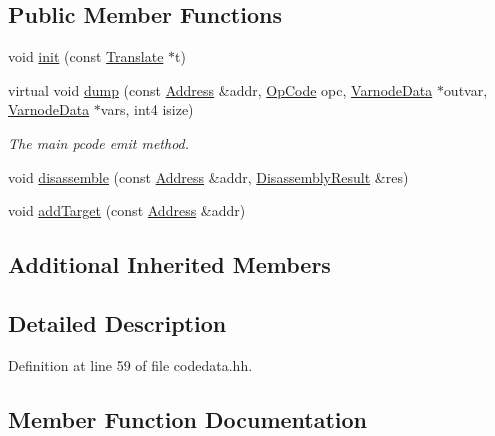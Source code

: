\subsection*{Public Member Functions}
\begin{DoxyCompactItemize}
\item 
void \mbox{\hyperlink{class_disassembly_engine_a7e152dadcc1051af27f535a76f207a7a}{init}} (const \mbox{\hyperlink{class_translate}{Translate}} $\ast$t)
\item 
virtual void \mbox{\hyperlink{class_disassembly_engine_a33295e9d637ed2e437d3cbd6481eb20d}{dump}} (const \mbox{\hyperlink{class_address}{Address}} \&addr, \mbox{\hyperlink{opcodes_8hh_abeb7dfb0e9e2b3114e240a405d046ea7}{Op\+Code}} opc, \mbox{\hyperlink{struct_varnode_data}{Varnode\+Data}} $\ast$outvar, \mbox{\hyperlink{struct_varnode_data}{Varnode\+Data}} $\ast$vars, int4 isize)
\begin{DoxyCompactList}\small\item\em The main pcode emit method. \end{DoxyCompactList}\item 
void \mbox{\hyperlink{class_disassembly_engine_ad09a3d8b19efae613f8e45e59ccdd3e6}{disassemble}} (const \mbox{\hyperlink{class_address}{Address}} \&addr, \mbox{\hyperlink{struct_disassembly_result}{Disassembly\+Result}} \&res)
\item 
void \mbox{\hyperlink{class_disassembly_engine_ab2912ebd18c438f0d85425b8314ed0c9}{add\+Target}} (const \mbox{\hyperlink{class_address}{Address}} \&addr)
\end{DoxyCompactItemize}
\subsection*{Additional Inherited Members}


\subsection{Detailed Description}


Definition at line 59 of file codedata.\+hh.



\subsection{Member Function Documentation}
\mbox{\label{class_disassembly_engine_ab2912ebd18c438f0d85425b8314ed0c9}} 
